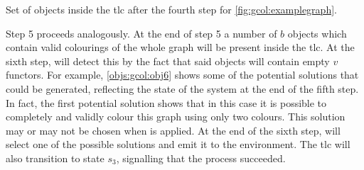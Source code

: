 \begin{cpobjectsfloat}
\begin{cpobjects}
    
    
    
    
    \cpobjectsline{\vdots}
    
    
    
\end{cpobjects}
\caption[Example set of objects inside the \gls{tlc} after the fourth step the for \gls{gcp} \gls{cps} solution]{\label{objs:gcol:obj4}Set of objects inside the \gls{tlc} after the fourth step for \cref{fig:gcol:examplegraph}.}
\end{cpobjectsfloat}

Step 5 proceeds analogously.  At the end of step 5 a number of \(b\) objects which contain valid colourings of the whole graph will be present inside the \gls{tlc}.  At the sixth step,  will detect this by the fact that said objects will contain empty \(v\) functors.  For example, \cref{objs:gcol:obj6} shows some of the potential solutions that could be generated, reflecting the state of the system at the end of the fifth step.  In fact, the first potential solution shows that in this case it is possible to completely and validly colour this graph using only two colours.  This solution may or may not be chosen when  is applied.  At the end of the sixth step,  will select one of the possible solutions and emit it to the environment.  The \gls{tlc} will also transition to state \(s_3\), signalling that the process succeeded.

